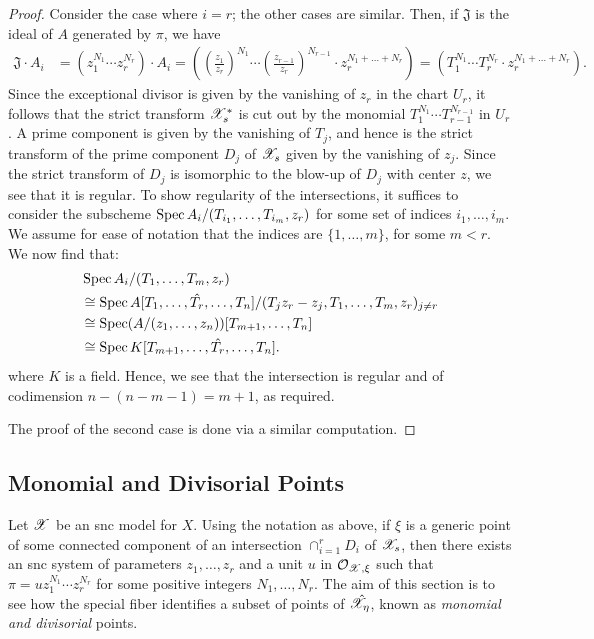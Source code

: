 \begin{proof}
    Consider the case where $i = r$; the other cases are similar. 
    Then, if $\mathfrak{J}$ is the ideal of $A$ generated by $\pi$, we have
    \begin{align*}
        \mathfrak{J} \cdot A_i & = (z_1^{N_1} \cdots z_r^{N_r}) \cdot A_i
        = \left(\left(\frac{z_1}{z_r}\right)^{N_1} \cdots \left(\frac{z_{r-1}}{z_r}\right)^{N_{r - 1}} \cdot z_r^{N_1 + \dots + N_r} \right)
        = \left(T_1^{N_1} \cdots T_r^{N_r} \cdot z_r^{N_1 + \dots + N_r} \right).
    \end{align*}
    Since the exceptional divisor is given by the vanishing of $z_r$ in the chart $U_r$, it follows that the strict transform $\mathscr{X}^{*}_{s}$ is cut out by the monomial $T_1^{N_1} \cdots T_{r - 1}^{N_{r -1}}$ in $U_r$.
    A prime component is given by the vanishing of $T_j$, and hence is the strict transform of the prime component $D_j$ of $\mathscr{X}_s$ given by the vanishing of $z_j$.
    Since the strict transform of $D_j$ is isomorphic to the blow-up of $D_j$ with center $z$, we see that it is regular.
    To show regularity of the intersections, it suffices to consider the subscheme $\operatorname{Spec} A_i/(T_{i_1}, \dots, T_{i_m}, z_r)$ for some set of indices $i_1, \dots, i_m$.
    We assume for ease of notation that the indices are $\{1, \dots, m\}$, for some $m < r$.
    We now find that:
    \begin{align*}
        & \operatorname{Spec} A_i/(T_1, \dots, T_m, z_r) \\ 
        & \cong \operatorname{Spec} A[T_1, \dots, \hat{T_r}, \dots, T_n]/(T_jz_r - z_j, T_1, \dots, T_m, z_r)_{j \neq r} \\
        & \cong \operatorname{Spec} (A/(z_1, \dots, z_n))[T_{m + 1}, \dots, T_n] \\
        & \cong \operatorname{Spec} K[T_{m + 1}, \dots, \hat{T_r}, \dots, T_n].
    \end{align*}
    where $K$ is a field.
    Hence, we see that the intersection is regular and of codimension $n - (n - m - 1) = m + 1$, as required.
    
    The proof of the second case is done via a similar computation.
\end{proof}

\subsection{Monomial and Divisorial Points}

Let $\mathscr{X}$ be an snc model for $X$.
Using the notation as above, if $\xi$ is a generic point of some connected component of an intersection $\cap_{i = 1}^{r} D_i$ of $\mathscr{X}_s$, then there exists an snc system of parameters $z_1, \dots, z_r$ and a unit $u$ in $\mathcal{O}_{\mathscr{X}, \xi}$ such that $\pi = u z_1^{N_1} \cdots z_r^{N_r}$ for some positive integers $N_1, \dots, N_r$. 
The aim of this section is to see how the special fiber identifies a subset of points of $\hat{\mathscr{X}}_{\eta}$, known as \textit{monomial and divisorial} points.

